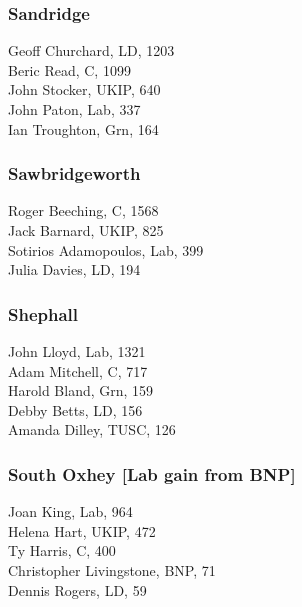 \documentclass[a4paper,openany,10pt]{book}
\begin{document}
\subsubsection*{Sandridge}



Geoff Churchard, LD, 1203\\
Beric Read, C, 1099\\
John Stocker, UKIP, 640\\
John Paton, Lab, 337\\
Ian Troughton, Grn, 164\\


\subsubsection*{Sawbridgeworth}



Roger Beeching, C, 1568\\
Jack Barnard, UKIP, 825\\
Sotirios Adamopoulos, Lab, 399\\
Julia Davies, LD, 194\\


\subsubsection*{Shephall}



John Lloyd, Lab, 1321\\
Adam Mitchell, C, 717\\
Harold Bland, Grn, 159\\
Debby Betts, LD, 156\\
Amanda Dilley, TUSC, 126\\


\subsubsection*{South Oxhey \hspace*{\fill}\nolinebreak[1]%
\enspace\hspace*{\fill}
[Lab gain from BNP]}



Joan King, Lab, 964\\
Helena Hart, UKIP, 472\\
Ty Harris, C, 400\\
Christopher Livingstone, BNP, 71\\
Dennis Rogers, LD, 59\\
\end{document}
